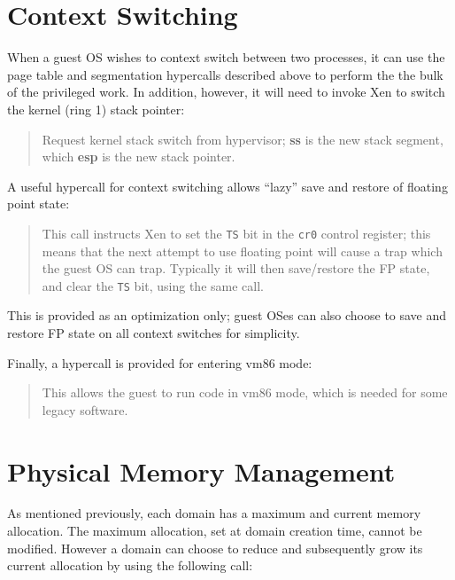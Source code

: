 \documentclass[11pt,twoside,final,openright]{report}
\newcommand{\hypercall}[1]{\vspace{2mm}{\sf #1}}
\begin{document}
\section{Context Switching} 

When a guest OS wishes to context switch between two processes, 
it can use the page table and segmentation hypercalls described
above to perform the the bulk of the privileged work. In addition, 
however, it will need to invoke Xen to switch the kernel (ring 1) 
stack pointer: 

\begin{quote} 
\hypercall{stack\_switch(unsigned long ss, unsigned long esp)} 

Request kernel stack switch from hypervisor; {\bf ss} is the new 
stack segment, which {\bf esp} is the new stack pointer. 

\end{quote} 

A useful hypercall for context switching allows ``lazy'' save and
restore of floating point state:

\begin{quote}
\hypercall{fpu\_taskswitch(int set)} 

This call instructs Xen to set the {\tt TS} bit in the {\tt cr0}
control register; this means that the next attempt to use floating
point will cause a trap which the guest OS can trap. Typically it will
then save/restore the FP state, and clear the {\tt TS} bit, using the
same call.
\end{quote} 

This is provided as an optimization only; guest OSes can also choose
to save and restore FP state on all context switches for simplicity. 

Finally, a hypercall is provided for entering vm86 mode:

\begin{quote}
\hypercall{switch\_vm86}

This allows the guest to run code in vm86 mode, which is needed for
some legacy software.
\end{quote}

\section{Physical Memory Management}

As mentioned previously, each domain has a maximum and current 
memory allocation. The maximum allocation, set at domain creation 
time, cannot be modified. However a domain can choose to reduce 
and subsequently grow its current allocation by using the
following call: 
\end{document}
